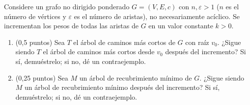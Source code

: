 
Considere un grafo no dirigido ponderado $G = (V, E, c)$ con $n, \varepsilon > 1$ ($n$ es el número de vértices y $\varepsilon$ es el número de aristas), no necesariamente acíclico. Se incrementan los pesos de todas las aristas de $G$ en un valor constante $k > 0$.

\begin{enumerate}[label=(\alph*)]
  \item (0,5 puntos) Sea $T$ el árbol de caminos más cortos de $G$ con raíz $v_0$. ¿Sigue siendo $T$ el árbol de caminos más cortos desde $v_0$ después del incremento? Si sí, demuéstrelo; si no, dé un contraejemplo.

  \respuesta[height=10cm]

  \item (0,25 puntos) Sea $M$ un árbol de recubrimiento mínimo de $G$. ¿Sigue siendo $M$ un árbol de recubrimiento mínimo después del incremento? Si sí, demuéstrelo; si no, dé un contraejemplo.

\end{enumerate}
